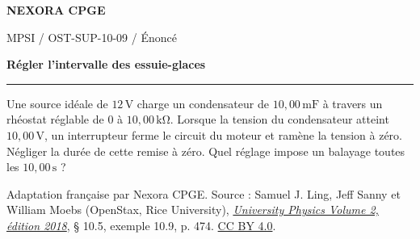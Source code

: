 \documentclass[11pt,a4paper]{article}
\begin{document}
\makeatletter
\def\@oddfoot{\footnotesize Download for free at \url{https://openstax.org/details/books/university-physics-volume-2}.\hfil\thepage}
\let\@evenfoot\@oddfoot
\makeatother
{\small\bfseries\color{nexorablue} NEXORA CPGE}\par
{\small MPSI / OST-SUP-10-09 / Énoncé}\par
{\LARGE\bfseries Régler l’intervalle des essuie-glaces}\par
\vspace{0.25em}\hrule\vspace{0.6em}

Une source idéale de $12\,\mathrm V$ charge un condensateur de $10{,}00\,\mathrm{mF}$ à travers un rhéostat réglable de $0$ à $10{,}00\,\mathrm{k\Omega}$. Lorsque la tension du condensateur atteint $10{,}00\,\mathrm V$, un interrupteur ferme le circuit du moteur et ramène la tension à zéro. Négliger la durée de cette remise à zéro. Quel réglage impose un balayage toutes les $10{,}00\,\mathrm s$ ?

\bigskip
{\footnotesize Adaptation française par Nexora CPGE. Source : Samuel J. Ling, Jeff Sanny et William Moebs (OpenStax, Rice University),
\href{https://d3bxy9euw4e147.cloudfront.net/oscms-prod/media/documents/UniversityPhysicsVolume2-OP.pdf\#page=484}{\textit{University Physics Volume 2, édition 2018}}, § 10.5, exemple 10.9, p. 474.
\href{https://creativecommons.org/licenses/by/4.0/}{CC BY 4.0}.}
\end{document}
